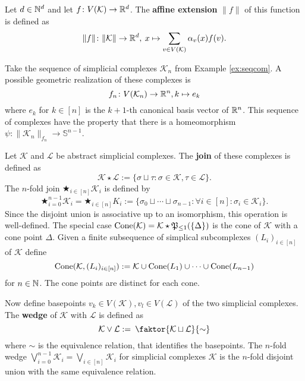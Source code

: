 \begin{defin}
  Let $d \in \mathbb{N}^d$ and let $f\colon V(\mathcal{K}) \to \mathbb{R}^d$. The \textbf{affine extension} $\lVert f \rVert$ of this function is defined as
  \begin{equation*}
    \lVert f \rVert\colon \lVert \mathcal{K} \rVert \to \mathbb{R}^d,\: x \mapsto \sum\limits_{v \in V(\mathcal{K})} \alpha_v(x) f(v).
  \end{equation*}
\end{defin}

\begin{ex}
  Take the sequence of simplicial complexes $\mathcal{K}_n$ from Example \ref{ex:seqcom}. A possible geometric realization of these complexes is
  \begin{equation*}
    f_n\colon V(\mathcal{K}_n) \to \mathbb{R}^n, k \mapsto e_k 
  \end{equation*}
  where $e_k$ for $k \in [n]$ is the $k+1$-th canonical basis vector of $\mathbb{R}^n$. This sequence of complexes have the property that there is a homeomorphism $\psi\colon \lVert \mathcal{K}_n \rVert_{f_n} \to \mathbb{S}^{n-1}$.
\end{ex}

\begin{defin}
  Let $\mathcal{K}$ and $\mathcal{L}$ be abstract simplicial complexes. The \textbf{join} of these complexes is defined as
  \begin{equation*}
    \mathcal{K} \star \mathcal{L} := \{\sigma \sqcup \tau\colon \sigma \in \mathcal{K}, \tau \in \mathcal{L} \}.
  \end{equation*}
  The $n$-fold join $\bigstar_{i \in [n]} \mathcal{K}_i$ is defined by
  \begin{equation*}
    \bigstar_{i=0}^{n-1} \mathcal{K}_i = \bigstar_{i \in [n]} K_i := \{\sigma_0 \sqcup \cdots \sqcup \sigma_{n-1}\colon \forall i\in [n]\colon \sigma_i \in \mathcal{K}_i\}.
  \end{equation*}
  Since the disjoint union is associative up to an isomorphism, this operation is well-defined.
  The special case ${\rm Cone}(\mathcal{K}) = \mathcal{K} \star \mathfrak{P}_{\leq 1}(\{ \Delta \})$ is the cone of $\mathcal{K}$ with a cone point $\Delta$. Given a finite subsequence of simplical subcomplexes $(L_i)_{i\in [n]}$ of $\mathcal{K}$ define \[{\rm Cone}(\mathcal{K}, (L_i)_{i\in [n]}) := \mathcal{K} \cup {\rm Cone}(L_1) \cup \cdots \cup {\rm Cone}(L_{n-1})\] for $n \in \mathbb{N}$. The cone points are distinct for each cone.

  
  Now define basepoints $v_k \in V(\mathcal{K}), v_l \in V(\mathcal{L})$ of the two simplicial complexes. The \textbf{wedge} of $\mathcal{K}$ with $\mathcal{L}$ is defined as
  \begin{equation*}
    \mathcal{K} \lor \mathcal{L} := \: \faktor{\mathcal{K} \sqcup \mathcal{L}}{\sim}
  \end{equation*}
  where $\sim$ is the equivalence relation, that identifies the basepoints.
  The $n$-fold wedge $\bigvee_{i=0}^{n-1} \mathcal{K}_i= \bigvee\limits_{i \in [n]} \mathcal{K}_i$ for simplicial complexes $\mathcal{K}$ is the $n$-fold disjoint union with the same equivalence relation.
\end{defin}

